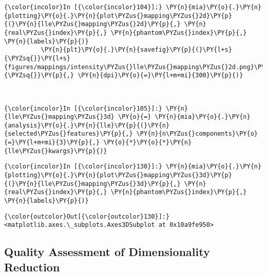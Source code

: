     \begin{Verbatim}[commandchars=\\\{\}]
{\color{incolor}In [{\color{incolor}104}]:} \PY{n}{mia}\PY{o}{.}\PY{n}{plotting}\PY{o}{.}\PY{n}{plot\PYZus{}mapping\PYZus{}2d}\PY{p}{(}\PY{n}{lle\PYZus{}mapping\PYZus{}2d}\PY{p}{,} \PY{n}{real\PYZus{}index}\PY{p}{,} \PY{n}{phantom\PYZus{}index}\PY{p}{,} \PY{n}{labels}\PY{p}{)}
          \PY{n}{plt}\PY{o}{.}\PY{n}{savefig}\PY{p}{(}\PY{l+s}{\PYZsq{}}\PY{l+s}{figures/mappings/intensity\PYZus{}lle\PYZus{}mapping\PYZus{}2d.png}\PY{l+s}{\PYZsq{}}\PY{p}{,} \PY{n}{dpi}\PY{o}{=}\PY{l+m+mi}{300}\PY{p}{)}
\end{Verbatim}

    \begin{center}
    \end{center}
    { \hspace*{\fill} \\}

    \begin{Verbatim}[commandchars=\\\{\}]
{\color{incolor}In [{\color{incolor}105}]:} \PY{n}{lle\PYZus{}mapping\PYZus{}3d} \PY{o}{=} \PY{n}{mia}\PY{o}{.}\PY{n}{analysis}\PY{o}{.}\PY{n}{lle}\PY{p}{(}\PY{n}{selected\PYZus{}features}\PY{p}{,} \PY{n}{n\PYZus{}components}\PY{o}{=}\PY{l+m+mi}{3}\PY{p}{,} \PY{o}{*}\PY{o}{*}\PY{n}{lle\PYZus{}kwargs}\PY{p}{)}
\end{Verbatim}

    \begin{Verbatim}[commandchars=\\\{\}]
{\color{incolor}In [{\color{incolor}130}]:} \PY{n}{mia}\PY{o}{.}\PY{n}{plotting}\PY{o}{.}\PY{n}{plot\PYZus{}mapping\PYZus{}3d}\PY{p}{(}\PY{n}{lle\PYZus{}mapping\PYZus{}3d}\PY{p}{,} \PY{n}{real\PYZus{}index}\PY{p}{,} \PY{n}{phantom\PYZus{}index}\PY{p}{,} \PY{n}{labels}\PY{p}{)}
\end{Verbatim}

            \begin{Verbatim}[commandchars=\\\{\}]
{\color{outcolor}Out[{\color{outcolor}130}]:} <matplotlib.axes.\_subplots.Axes3DSubplot at 0x10a9fe950>
\end{Verbatim}

    \subsection{Quality Assessment of Dimensionality
Reduction}\label{quality-assessment-of-dimensionality-reduction}

